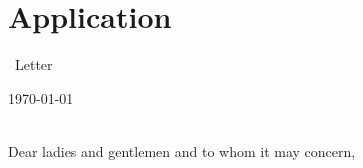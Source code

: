 \documentclass[11pt,a4paper]{moderncv}
\newcommand{\position}{%
    a software engineer}%
\newcommand{\posaddress}{%
    }%
\begin{document}
\chapter{Application}{~Letter}%
%
\begin{minipage}{0.6\textwidth}%
    \begin{flushleft}%
        \vspace*{.7cm}%
    \end{flushleft}%
\end{minipage}%
\hfill%
\begin{minipage}{0.3\textwidth}%
    \begin{flushright}%
        \vspace*{.7cm}%
        \today%
    \end{flushright}%
\end{minipage}%
%
\vspace*{.5cm}%
{\bfseries%
}\\[0.25cm]%
%
Dear ladies and gentlemen and to whom it may concern,\\[0.25cm]%
%
\end{document}
